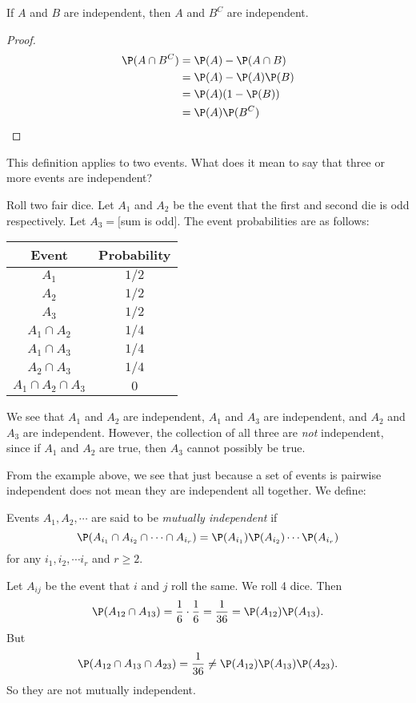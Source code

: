 \documentclass[a4paper]{article}
\begin{document}
\begin{prop}
  If $A$ and $B$ are independent, then $A$ and $B^C$ are independent.
\end{prop}

\begin{proof}
  \begin{align*}
    \P(A\cap B^C) &= \P(A) - \P(A\cap B)\\
    &= \P(A) - \P(A)\P(B)\\
    &= \P(A)(1 - \P(B))\\
    &= \P(A)\P(B^C)
  \end{align*}
\end{proof}

This definition applies to two events. What does it mean to say that three or more events are independent?
\begin{eg}
  Roll two fair dice. Let $A_1$ and $A_2$ be the event that the first and second die is odd respectively. Let $A_3 = [$sum is odd$]$. The event probabilities are as follows:
  \begin{center}
    \begin{tabular}{cc}
      \toprule
      Event & Probability\\
      \midrule
      $A_1$ & $1/2$\\
      $A_2$ & $1/2$\\
      $A_3$ & $1/2$\\
      $A_1\cap A_2$ & $1/4$\\
      $A_1\cap A_3$ & $1/4$\\
      $A_2\cap A_3$ & $1/4$\\
      $A_1\cap A_2\cap A_3$ & $0$\\
      \bottomrule
    \end{tabular}
  \end{center}
  We see that $A_1$ and $A_2$ are independent, $A_1$ and $A_3$ are independent, and $A_2$ and $A_3$ are independent. However, the collection of all three are \emph{not} independent, since if $A_1$ and $A_2$ are true, then $A_3$ cannot possibly be true.
\end{eg}

From the example above, we see that just because a set of events is pairwise independent does not mean they are independent all together. We define:
\begin{defi}
  Events $A_1, A_2, \cdots$ are said to be \emph{mutually independent} if
  \[
    \P(A_{i_1}\cap A_{i_2} \cap \cdots \cap A_{i_r}) = \P(A_{i_1})\P(A_{i_2})\cdots \P(A_{i_r})
  \]
  for any $i_1, i_2, \cdots i_r$ and $r \geq 2$.
\end{defi}
\begin{eg}
  Let $A_{ij}$ be the event that $i$ and $j$ roll the same. We roll 4 dice. Then
  \[
    \P(A_{12}\cap A_{13}) = \frac{1}{6}\cdot \frac{1}{6} = \frac{1}{36} = \P(A_{12})\P(A_{13}).
  \]
  But
  \[
    \P(A_{12}\cap A_{13}\cap A_{23}) = \frac{1}{36} \not= \P(A_{12})\P(A_{13})\P(A_{23}).
  \]
  So they are not mutually independent.
\end{eg}
\end{document}
